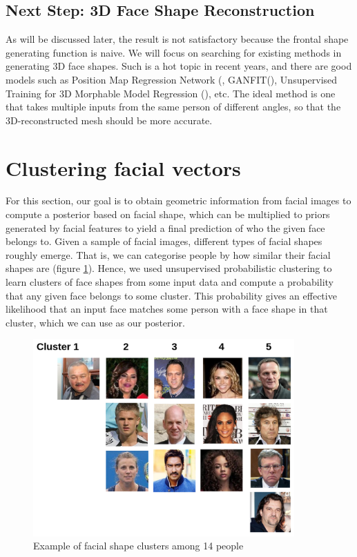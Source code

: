 \documentclass{article}
\begin{document}
\subsection{Next Step: 3D Face Shape Reconstruction}
\label{section:3D_reconstruction}

As will be discussed later, the result is not satisfactory because the frontal
shape generating function is naive. We will focus on searching for existing
methods in generating 3D face shapes. Such is a hot topic in recent years, and
there are good models such as Position Map Regression Network
(\cite{feng2018joint}, GANFIT(\cite{ganfit}), Unsupervised Training for 3D
Morphable Model Regression (\cite{genova2018unsupervised}), etc. The ideal
method is one that takes multiple inputs from the same person of different
angles, so that the 3D-reconstructed mesh should be more accurate.


\section{Clustering facial vectors}

For this section, our goal is to obtain geometric information from facial images
to compute a posterior based on facial shape, which can be multiplied to priors
generated by facial features to yield a final prediction of who the given face
belongs to. Given a sample of facial images, different types of facial shapes
roughly emerge. That is, we can categorise people by how similar their facial
shapes are (figure \ref{fig:cluster_example}). Hence, we used unsupervised
probabilistic clustering to learn clusters of face shapes from some input data
and compute a probability that any given face belongs to some cluster. This
probability gives an effective likelihood that an input face matches some person
with a face shape in that cluster, which we can use as our posterior.

\begin{figure}[ht]
  \centering
  \includegraphics[width=10cm]{images/cluster_example.png}
  \caption{Example of facial shape clusters among 14 people}
  \label{fig:cluster_example}
\end{figure}
\end{document}
